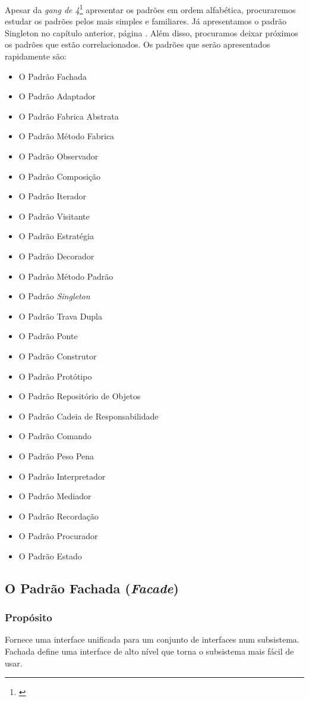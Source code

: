 Apesar da \textit{gang de 4}\footnote{\cite{design:patterns}} apresentar os padrões em ordem alfabética, procuraremos estudar os padrões pelos mais simples e familiares. Já apresentamos o padrão Singleton no capítulo anterior, página \pageref{p:singleton}. Além disso, procuramos deixar próximos os padrões que estão correlacionados. Os padrões que serão apresentados rapidamente são:

\begin{itemize}
\item O Padrão Fachada
\item O Padrão Adaptador
\item O Padrão Fabrica Abstrata
\item O Padrão Método Fabrica
\item O Padrão Observador
\item O Padrão Composição
\item O Padrão Iterador
\item O Padrão Visitante
\item O Padrão Estratégia
\item O Padrão Decorador
\item O Padrão Método Padrão
\item O Padrão \textit{Singleton}
\item O Padrão Trava Dupla
\item O Padrão Ponte
\item O Padrão Construtor
\item O Padrão Protótipo
\item O Padrão Repositório de Objetos
\item O Padrão Cadeia de Responsabilidade
\item O Padrão Comando
\item O Padrão Peso Pena
\item O Padrão Interpretador
\item O Padrão Mediador
\item O Padrão Recordação
\item O Padrão Procurador
\item O Padrão Estado
\end{itemize}

\subsection{O Padrão Fachada (\textit{Facade})}
\subsubsection{Propósito}
Fornece uma interface unificada para um conjunto de interfaces num subsistema. Fachada define uma interface de alto nível que torna o subsistema mais fácil de usar.

